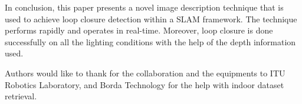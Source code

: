 \documentclass[]{spie}  %
\begin{document}
In conclusion, this paper presents a novel image description technique that is used to achieve loop closure detection within a SLAM framework. The technique performs rapidly and operates in real-time. Moreover, loop closure is done successfully on all the lighting conditions with the help of the depth information used.


\acknowledgments         

Authors would like to thank for the collaboration and the equipments to ITU Robotics Laboratory, and Borda Technology for the help with indoor dataset retrieval.


 
\end{document}

